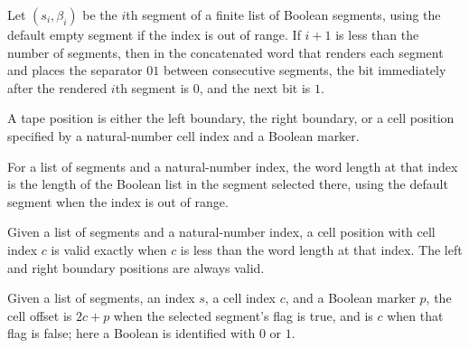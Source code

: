 \begin{lemma}
\leanok
{}
Let $(s_i,\beta_i)$ be the $i$th segment of a finite list of Boolean segments, using the
default empty segment if the index is out of range. If $i+1$ is less than the number of
segments, then in the concatenated word that renders each segment and places the
separator $01$ between consecutive segments, the bit immediately after the rendered
$i$th segment is $0$, and the next bit is $1$.
\end{lemma}

\begin{definition}
\label{Complexity.LogProg.TPos}
\leanok
A tape position is either the left boundary, the right boundary, or a cell position
specified by a natural-number cell index and a Boolean marker.
\end{definition}

\begin{definition}
\label{Complexity.LogProg.wlen}
\leanok
{}
For a list of segments and a natural-number index, the word length at that index is the
length of the Boolean list in the segment selected there, using the default segment when
the index is out of range.
\end{definition}

\begin{definition}
\label{Complexity.LogProg.TPos.Valid}
\leanok
{}
Given a list of segments and a natural-number index, a cell position with cell index $c$
is valid exactly when $c$ is less than the word length at that index. The left and right
boundary positions are always valid.
\end{definition}

\begin{definition}
\label{Complexity.LogProg.cellOff}
\leanok
{}
Given a list of segments, an index $s$, a cell index $c$, and a Boolean marker $p$, the
cell offset is $2c+p$ when the selected segment's flag is true, and is $c$ when that
flag is false; here a Boolean is identified with $0$ or $1$.
\end{definition}

